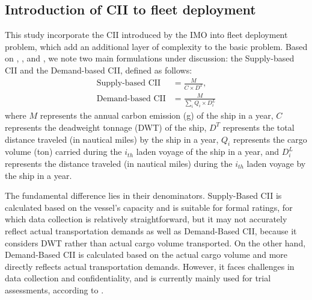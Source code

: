 \documentclass[11pt,english]{article}
\begin{document}
\subsection{Introduction of CII to fleet deployment}
\label{sec:intro_CII_to_model}

This study incorporate the CII introduced by the IMO into fleet deployment problem, which add an additional layer of complexity to the basic problem. Based on \cite{imo2020fourth}, \cite{mepc2021336}, \cite{mepc2022352} and \cite{wang2021paradox}, we note two main formulations under discussion: the Supply-based CII and the Demand-based CII, defined as follows:
\begin{align}
    \text{Supply-based CII} &= \frac{M}{C \times D^T},\\
    \text{Demand-based CII} &= \frac{M}{\sum_{i} Q_i \times D^L_i}
    \label{eq:cii}
\end{align}
where $M$ represents the annual carbon emission (g) of the ship in a year, $C$ represents the deadweight tonnage (DWT) of the ship, $D^T$ represents the total distance traveled (in nautical miles) by the ship in a year, $Q_i$ represents the cargo volume (ton) carried during the $i_{th}$ laden voyage of the ship in a year, and $D^L_i$ represents the distance traveled (in nautical miles) during the $i_{th}$ laden voyage by the ship in a year. 

The fundamental difference lies in their denominators. Supply-Based CII is calculated based on the vessel's capacity and is suitable for formal ratings, for which data collection is relatively straightforward, but it may not accurately reflect actual transportation demands as well as Demand-Based CII, because it considers DWT rather than actual cargo volume transported. On the other hand, Demand-Based CII is calculated based on the actual cargo volume and more directly reflects actual transportation demands. However, it faces challenges in data collection and confidentiality, and is currently mainly used for trial assessments, according to \cite{mepc2022352}.
\end{document}
